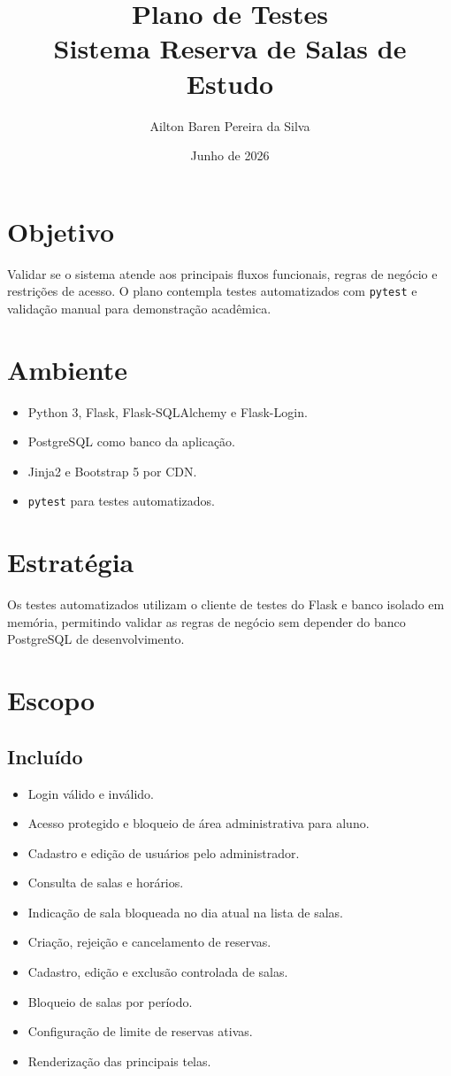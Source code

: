 \documentclass[12pt,a4paper]{article}
\title{\textbf{Plano de Testes}\\Sistema Reserva de Salas de Estudo}
\author{Ailton Baren Pereira da Silva}
\date{Junho de 2026}
\begin{document}
\maketitle

\section{Objetivo}
Validar se o sistema atende aos principais fluxos funcionais, regras de negócio e restrições de acesso. O plano contempla testes automatizados com \texttt{pytest} e validação manual para demonstração acadêmica.

\section{Ambiente}
\begin{itemize}
    \item Python 3, Flask, Flask-SQLAlchemy e Flask-Login.
    \item PostgreSQL como banco da aplicação.
    \item Jinja2 e Bootstrap 5 por CDN.
    \item \texttt{pytest} para testes automatizados.
\end{itemize}

\section{Estratégia}
Os testes automatizados utilizam o cliente de testes do Flask e banco isolado em memória, permitindo validar as regras de negócio sem depender do banco PostgreSQL de desenvolvimento.

\section{Escopo}
\subsection{Incluído}
\begin{itemize}
    \item Login válido e inválido.
    \item Acesso protegido e bloqueio de área administrativa para aluno.
    \item Cadastro e edição de usuários pelo administrador.
    \item Consulta de salas e horários.
    \item Indicação de sala bloqueada no dia atual na lista de salas.
    \item Criação, rejeição e cancelamento de reservas.
    \item Cadastro, edição e exclusão controlada de salas.
    \item Bloqueio de salas por período.
    \item Configuração de limite de reservas ativas.
    \item Renderização das principais telas.
\end{itemize}
\end{document}
